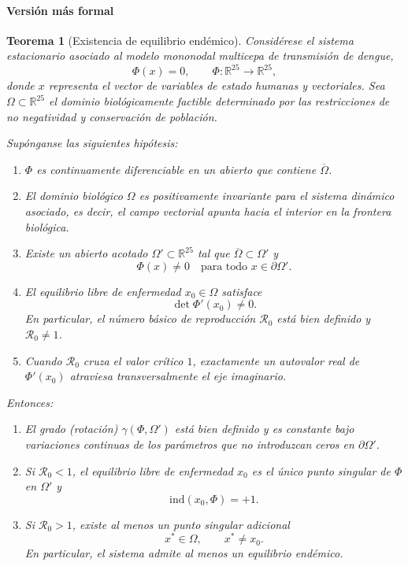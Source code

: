 \documentclass{article}
\newtheorem{theorem}{Teorema}
\numberwithin{equation}{section}
\begin{document}
\paragraph{Versión más formal}
\begin{theorem}[Existencia de equilibrio endémico]\label{thm:endemic_existence}
Considérese el sistema estacionario asociado al modelo mononodal multicepa de transmisión de dengue,
\[
\Phi(x)=0, \qquad \Phi:\mathbb{R}^{25}\to\mathbb{R}^{25},
\]
donde $x$ representa el vector de variables de estado humanas y vectoriales. 
Sea $\Omega \subset \mathbb{R}^{25}$ el dominio biológicamente factible determinado por las restricciones de no negatividad y conservación de población.

Supónganse las siguientes hipótesis:

\begin{enumerate}
\item[(H1)] $\Phi$ es continuamente diferenciable en un abierto que contiene $\overline{\Omega}$.

\item[(H2)] El dominio biológico $\Omega$ es positivamente invariante para el sistema dinámico asociado, es decir, el campo vectorial apunta hacia el interior en la frontera biológica.

\item[(H3)] Existe un abierto acotado $\Omega' \subset \mathbb{R}^{25}$ tal que 
$\overline{\Omega} \subset \Omega'$ y 
\[
\Phi(x) \neq 0 \quad \text{para todo } x \in \partial \Omega'.
\]

\item[(H4)] El equilibrio libre de enfermedad $x_0 \in \Omega$ satisface
\[
\det \Phi'(x_0) \neq 0.
\]
En particular, el número básico de reproducción $\mathcal R_0$ está bien definido y $\mathcal R_0 \neq 1$.

\item[(H5)] Cuando $\mathcal R_0$ cruza el valor crítico $1$, exactamente un autovalor real de $\Phi'(x_0)$ atraviesa transversalmente el eje imaginario.
\end{enumerate}

Entonces:

\begin{enumerate}
\item[(i)] El grado (rotación) $\gamma(\Phi,\Omega')$ está bien definido y es constante bajo variaciones continuas de los parámetros que no introduzcan ceros en $\partial \Omega'$.

\item[(ii)] Si $\mathcal R_0 < 1$, el equilibrio libre de enfermedad $x_0$ es el único punto singular de $\Phi$ en $\Omega'$ y
\[
\mathrm{ind}(x_0,\Phi)=+1.
\]

\item[(iii)] Si $\mathcal R_0 > 1$, existe al menos un punto singular adicional
\[
x^\ast \in \Omega, \qquad x^\ast \neq x_0.
\]
En particular, el sistema admite al menos un equilibrio endémico.
\end{enumerate}
\end{theorem}
\end{document}
